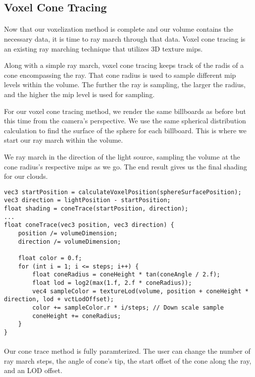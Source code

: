 \newpage
\subsection{Voxel Cone Tracing}\paragraph{}
Now that our voxelization method is complete and our volume contains the necessary data, it is time to ray march through that data. Voxel cone tracing is an existing ray marching technique that utilizes 3D texture mips.

Along with a simple ray march, voxel cone tracing keeps track of the radis of a cone encompassing the ray. That cone radius is used to sample different mip levels within the volume. The further the ray is sampling, the larger the radius, and the higher the mip level is used for sampling. 


For our voxel cone tracing method, we render the same billboards as before but this time from the camera's perspective. We use the same spherical distribution calculation to find the surface of the sphere for each billboard. This is where we start our ray march within the volume. 

We ray march in the direction of the light source, sampling the volume at the cone radius's respective mips as we go. The end result gives us the final shading for our clouds. 
\begin{lstlisting}[caption={conetrace\_frag.glsl, 63}]
vec3 startPosition = calculateVoxelPosition(sphereSurfacePosition);
vec3 direction = lightPosition - startPosition;
float shading = coneTrace(startPosition, direction);
...
float coneTrace(vec3 position, vec3 direction) {
    position /= volumeDimension;
    direction /= volumeDimension;

    float color = 0.f;
    for (int i = 1; i <= steps; i++) {
        float coneRadius = coneHeight * tan(coneAngle / 2.f);
        float lod = log2(max(1.f, 2.f * coneRadius));
        vec4 sampleColor = textureLod(volume, position + coneHeight * direction, lod + vctLodOffset);
        color += sampleColor.r * i/steps; // Down scale sample
        coneHeight += coneRadius;
    }
}
\end{lstlisting}\paragraph{}


Our cone trace method is fully paramterized. The user can change the number of ray march steps, the angle of cone's tip, the start offset of the cone along the ray, and an LOD offset. 

